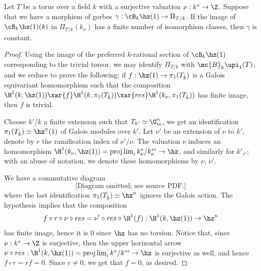 \begin{lemma}
\notready\label{uniqueloop}
	Let $T$ be a torus over a field $k$ with a surjective valuation $\nu:k^{*}\to\Z$. Suppose that we have a morphism of gerbes $\gamma:\cB_{k}\hz(1)\to \Pi_{T/k}$. If the image of $\cB_{k}\hz(1)(k)$ in $\Pi_{T/k}(k_{\nu})$ has a finite number of isomorphism classes, then $\gamma$ is constant.
	\begin{proof}
    Using the image of the preferred $k$-rational section of $\cB_{k}\hz(1)$ corresponding to the trivial torsor, we may identify $\Pi_{T/k}$ with $\mc{B}_{k}\upi_{1}(T)$, and we reduce to prove the following: if $f:\hz(1)\to\pi_{1}(T_{\bar{k}})$ is a Galois equivariant homomorphism such that the composition $\H^{1}(k,\hz(1))\xar{f} \H^{1}(k,\pi_{1}(T_{\bar{k}})) \xar{res} \H^{1}(k_{\nu},\pi_{1}(T_{\bar{k}}))$ has finite image, then $f$ is trivial.

    Choose $k'/k$ a finite extension such that $T_{k'}\simeq\G_{m}^{n}$, we get an identification $\pi_{1}(T_{\bar{k}})\simeq \hz^{n}(1)$ of Galois modules over $k'$. Let $\nu'$ be an extension of $\nu$ to $k'$, denote by $r$ the ramification index of $\nu'/\nu$. The valuation $\nu$ induces an homomorphism $\H^{1}(k_{\nu},\hz(1))=\projlim_{i}k_{\nu}^{*}/k_{\nu}^{*i}\to \hz$, and similarly for $k'_{\nu'}$; with an abuse of notation, we denote these homomorphisms by $\nu$, $\nu'$.


    We have a commutative diagram
    \[\text{[Diagram omitted; see source PDF.]}\]
    where the last identification $\pi_{1}(T_{\bar{k}})\simeq \hz^{n}$ ignores the Galois action. The hypothesis implies that the composition
    \[f\circ r \circ \nu \circ res = \nu' \circ res \circ \H^{1}(f) : \H^{1}(k,\hz(1)) \to \hz^{n}\]
    has finite image, hence it is $0$ since $\hz$ has no torsion.  Notice that, since $\nu:k^{*}\to\Z$ is surjective, then the upper horizontal arrow $\nu \circ res: \H^{1}(k,\hz(1))=\projlim_{i}k^{*}/k^{*i} \to \hz$ is surjective as well, and hence $f\circ r =rf=0$. Since $r\neq 0$, we get that $f=0$, as desired.


\end{proof}
\end{lemma}
